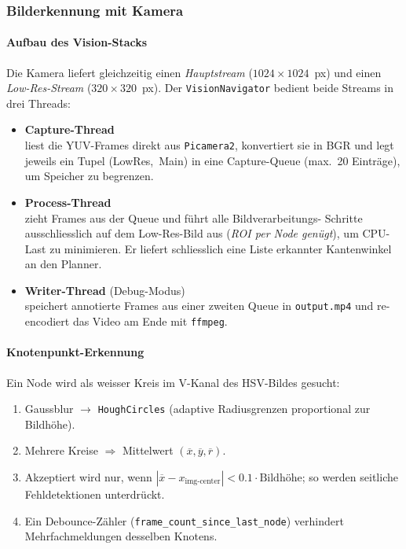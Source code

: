\documentclass[main.tex]{subfiles} %
\begin{document}
\subsubsection{Bilderkennung mit Kamera}

\paragraph{Aufbau des Vision-Stacks}
Die Kamera liefert gleichzeitig einen \emph{Hauptstream}
($1024\times1024$~px) und einen \emph{Low-Res-Stream}
($320\times320$~px).
Der \texttt{VisionNavigator} bedient beide Streams in drei Threads:
\begin{itemize}
  \item \textbf{Capture-Thread}\\
    liest die YUV-Frames direkt aus \texttt{Picamera2},
    konvertiert sie in BGR und legt
    jeweils ein Tupel \mbox{(LowRes, Main)} in eine
    Capture-Queue (max.~20 Einträge), um Speicher zu begrenzen.
  \item \textbf{Process-Thread}\\
    zieht Frames aus der Queue und führt alle Bildverarbeitungs-
    Schritte ausschliesslich auf dem Low-Res-Bild aus
    (\emph{ROI per Node genügt}), um CPU-Last zu minimieren.
    Er liefert schliesslich eine Liste
    erkannter Kantenwinkel an den Planner.
  \item \textbf{Writer-Thread} (Debug-Modus)\\
    speichert annotierte Frames aus einer zweiten Queue in
    \texttt{output.mp4} und re-encodiert das Video am Ende mit
    \texttt{ffmpeg}.
\end{itemize}

\paragraph{Knotenpunkt-Erkennung}
Ein Node wird als weisser Kreis im V-Kanal des HSV-Bildes gesucht:
\begin{enumerate}
  \item Gaussblur $\rightarrow$ \texttt{HoughCircles}
    (adaptive Radiusgrenzen proportional zur Bildhöhe).
  \item Mehrere Kreise $\Rightarrow$ Mittelwert
    $(\overline x, \overline y, \overline r)$.
  \item Akzeptiert wird nur, wenn
    $|\overline x-x_{\text{img-center}}|<0.1\cdot\text{Bildhöhe}$;
    so werden seitliche Fehldetektionen unterdrückt.
  \item Ein Debounce-Zähler
    (\texttt{frame\_count\_since\_last\_node})
    verhindert Mehrfachmeldungen desselben Knotens.
\end{enumerate}
\end{document}
